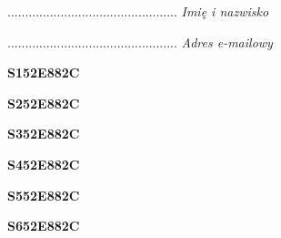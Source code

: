 \begin{turn}{90}\begin{minipage}{\linewidth} \vspace{20mm} ................................................  \textit{Imię i nazwisko}\end{minipage}\end{turn}

\begin{turn}{90}\begin{minipage}{\linewidth} \vspace{20mm} ................................................  \textit{Adres e-mailowy}\end{minipage}\end{turn}

\begin{turn}{90}\huge \begin{minipage}{\linewidth} \vspace{10mm}\textbf{S152E882C}\end{minipage}\end{turn}

\begin{turn}{90}\huge \begin{minipage}{\linewidth} \vspace{10mm}\textbf{S252E882C}\end{minipage}\end{turn}

\begin{turn}{90}\huge \begin{minipage}{\linewidth} \vspace{10mm}\textbf{S352E882C}\end{minipage}\end{turn}

\begin{turn}{90}\huge \begin{minipage}{\linewidth} \vspace{10mm}\textbf{S452E882C}\end{minipage}\end{turn}

\begin{turn}{90}\huge \begin{minipage}{\linewidth} \vspace{10mm}\textbf{S552E882C}\end{minipage}\end{turn}

\begin{turn}{90}\huge \begin{minipage}{\linewidth} \vspace{10mm}\textbf{S652E882C}\end{minipage}\end{turn}

